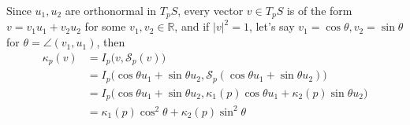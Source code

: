 \documentclass[10pt]{article}
\begin{document}
            \begin{example}
                Since $u_1, u_2$ are orthonormal in $T_pS$, every vector $v\in T_pS$ is of the form $v= v_1u_1+v_2u_2$ for some $v_1, v_2\in\mathbb{R}$, and if $|v|^2=1$, let's say $v_1 =\cos\theta, v_2=\sin\theta$ for $\theta=\angle(v_1, u_1)$, then
                \begin{equation*}
                    \begin{aligned}
                        \kappa_p(v) &= I_p\big(v, \mathcal{S}_p(v)\big) \\
                        &= I_p\big(\cos\theta u_1+\sin\theta u_2, \mathcal{S}_p(\cos\theta u_1+\sin\theta u_2)\big) \\
                        &= I_p\big(\cos\theta u_1+\sin\theta u_2, \kappa_1(p)\cos\theta u_1+\kappa_2(p)\sin\theta u_2\big) \\
                        &= \kappa_1(p)\cos^2\theta + \kappa_2(p)\sin^2\theta
                    \end{aligned}
                \end{equation*}
            \end{example}
\end{document}
